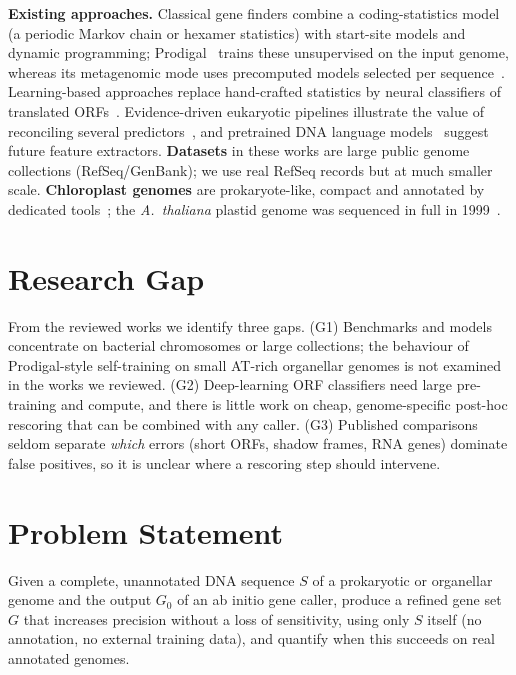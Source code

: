 \textbf{Existing approaches.} Classical gene finders combine a coding-statistics model (a periodic Markov chain or hexamer statistics) with start-site models and dynamic programming; Prodigal~\cite{hyatt2010} trains these unsupervised on the input genome, whereas its metagenomic mode uses precomputed models selected per sequence~\cite{larralde2022}. Learning-based approaches replace hand-crafted statistics by neural classifiers of translated ORFs~\cite{sommer2021,tu2023}. Evidence-driven eukaryotic pipelines illustrate the value of reconciling several predictors~\cite{gabriel2024}, and pretrained DNA language models~\cite{zhou2024} suggest future feature extractors. \textbf{Datasets} in these works are large public genome collections (RefSeq/GenBank); we use real RefSeq records but at much smaller scale. \textbf{Chloroplast genomes} are prokaryote-like, compact and annotated by dedicated tools~\cite{tillich2017}; the \textit{A.~thaliana} plastid genome was sequenced in full in 1999~\cite{sato1999}.

\section{Research Gap}
From the reviewed works we identify three gaps. (G1) Benchmarks and models concentrate on bacterial chromosomes or large collections; the behaviour of Prodigal-style self-training on small AT-rich organellar genomes is not examined in the works we reviewed. (G2) Deep-learning ORF classifiers need large pre-training and compute, and there is little work on cheap, genome-specific post-hoc rescoring that can be combined with any caller. (G3) Published comparisons seldom separate \emph{which} errors (short ORFs, shadow frames, RNA genes) dominate false positives, so it is unclear where a rescoring step should intervene.

\section{Problem Statement}
Given a complete, unannotated DNA sequence $S$ of a prokaryotic or organellar genome and the output $G_0$ of an ab initio gene caller, produce a refined gene set $G$ that increases precision without a loss of sensitivity, using only $S$ itself (no annotation, no external training data), and quantify when this succeeds on real annotated genomes.

